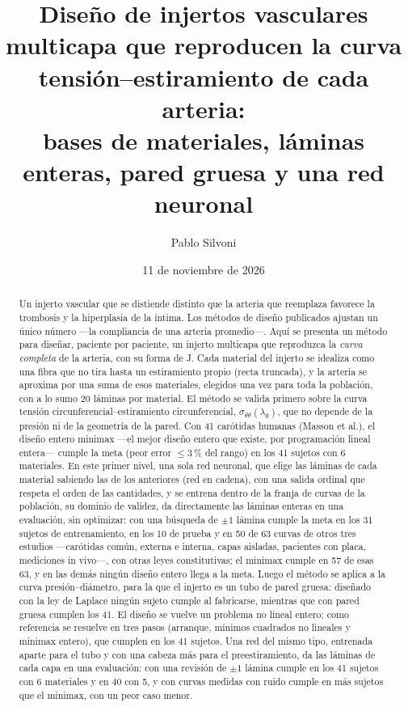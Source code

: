 
\title{\textbf{Diseño de injertos vasculares multicapa que reproducen la curva tensión--estiramiento de cada arteria:\\ bases de materiales, láminas enteras, pared gruesa y una red neuronal}}
\author{Pablo Silvoni}
\date{11 de noviembre de 2026}

\maketitle
\begin{abstract}
\noindent Un injerto vascular que se distiende distinto que la arteria que reemplaza favorece la trombosis y la hiperplasia de la íntima. Los métodos de diseño publicados ajustan un único número ---la compliancia de una arteria promedio---. Aquí se presenta un método para diseñar, paciente por paciente, un injerto multicapa que reproduzca la \emph{curva completa} de la arteria, con su forma de J. Cada material del injerto se idealiza como una fibra que no tira hasta un estiramiento propio (recta truncada), y la arteria se aproxima por una suma de esos materiales, elegidos una vez para toda la población, con a lo sumo 20 láminas por material. El método se valida primero sobre la curva tensión circunferencial--estiramiento circunferencial, $\sigma_{\theta\theta}(\lambda_\theta)$, que no depende de la presión ni de la geometría de la pared. Con 41 carótidas humanas (Masson et al.), el diseño entero minimax ---el mejor diseño entero que existe, por programación lineal entera--- cumple la meta (peor error $\le3$\,\% del rango) en los 41 sujetos con 6 materiales. En este primer nivel, una sola red neuronal, que elige las láminas de cada material sabiendo las de los anteriores (red en cadena), con una salida ordinal que respeta el orden de las cantidades, y se entrena dentro de la franja de curvas de la población, su dominio de validez, da directamente las láminas enteras en una evaluación, sin optimizar: con una búsqueda de $\pm1$ lámina cumple la meta en los 31 sujetos de entrenamiento, en los 10 de prueba y en 50 de 63 curvas de otros tres estudios ---carótidas común, externa e interna, capas aisladas, pacientes con placa, mediciones in vivo---, con otras leyes constitutivas; el minimax cumple en 57 de esas 63, y en las demás ningún diseño entero llega a la meta. Luego el método se aplica a la curva presión--diámetro, para la que el injerto es un tubo de pared gruesa: diseñado con la ley de Laplace ningún sujeto cumple al fabricarse, mientras que con pared gruesa cumplen los 41. El diseño se vuelve un problema no lineal entero; como referencia se resuelve en tres pasos (arranque, mínimos cuadrados no lineales y minimax entero), que cumplen en los 41 sujetos. Una red del mismo tipo, entrenada aparte para el tubo y con una cabeza más para el preestiramiento, da las láminas de cada capa en una evaluación: con una revisión de $\pm1$ lámina cumple en los 41 sujetos con 6 materiales y en 40 con 5, y con curvas medidas con ruido cumple en más sujetos que el minimax, con un peor caso menor.
\end{abstract}
\tableofcontents

